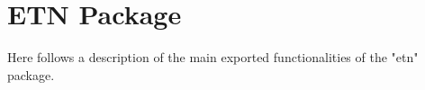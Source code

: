 \section{ETN Package}

Here follows a description of the main exported functionalities of the "etn" package.


\newpage

\newpage

\newpage

